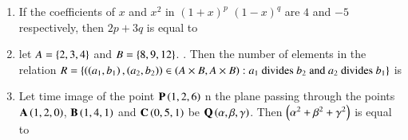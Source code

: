 \documentclass[journal]{IEEEtran}
\numberwithin{equation}{enumi}
\numberwithin{figure}{enumi}
\begin{document}
\begin{enumerate}

    \item 
    If the coefficients of $x$ and $x^2$ in $(1 + x)^p$ $(1 - x)^q$ are $4$ and $-5$ respectively, then $2p + 3q$ is equal to

    \hfill{}

    \begin{enumerate}
    \end{enumerate}

    \item 
    let $A = \left\{2, 3, 4\right\}$ and $B =  \left\{8, 9, 12\right\}$. . Then the number of elements in the relation $R = \left\{\left(\left(a_1, b_1\right), \left(a_2, b_2\right)\right) \in \left(A \times B, A \times B\right) : a_1 \text{ divides } b_2 \text{ and } a_2 \text{ divides } b_1\right\}$ is 

    \hfill{}

    \begin{enumerate}
    \end{enumerate}

    \item 
    Let time image of the point $\mathbf{P}\left(1, 2, 6\right)$ n the plane passing through the points $\mathbf{A}\left(1, 2, 0\right)$, $\mathbf{B}\left(1, 4, 1\right)$ and $\mathbf{C}\left(0, 5, 1\right)$ be $\mathbf{Q}\left(\alpha, \beta, \gamma\right)$. Then $\left(\alpha^2 + \beta^2 + \gamma^2\right)$ is equal to

    \hfill{}

    \begin{enumerate}
    \end{enumerate}


\end{enumerate}
\end{document}
